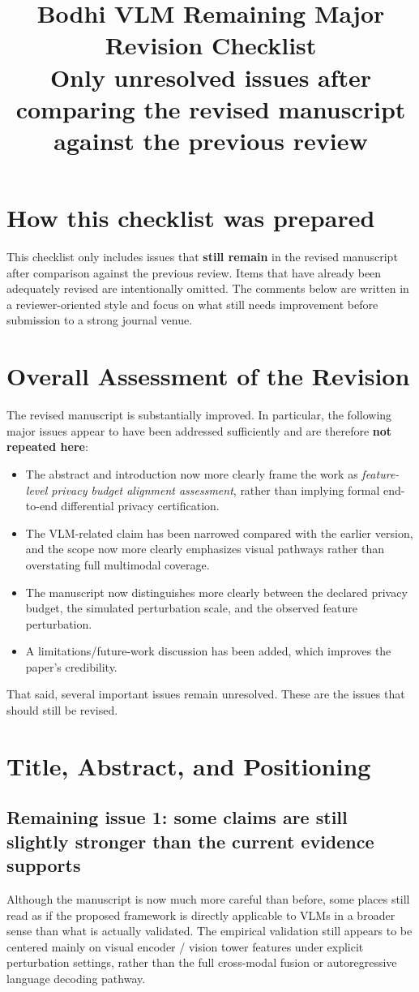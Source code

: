 \documentclass[11pt]{article}
\title{Bodhi VLM Remaining Major Revision Checklist\\
\large Only unresolved issues after comparing the revised manuscript against the previous review}
\author{}
\date{}
\begin{document}
\maketitle

\section*{How this checklist was prepared}
This checklist only includes issues that \textbf{still remain} in the revised manuscript after comparison against the previous review. 
Items that have already been adequately revised are intentionally omitted. 
The comments below are written in a reviewer-oriented style and focus on what still needs improvement before submission to a strong journal venue.

\section*{Overall Assessment of the Revision}
The revised manuscript is substantially improved. In particular, the following major issues appear to have been addressed sufficiently and are therefore \textbf{not repeated here}:
\begin{itemize}
    \item The abstract and introduction now more clearly frame the work as \emph{feature-level privacy budget alignment assessment}, rather than implying formal end-to-end differential privacy certification.
    \item The VLM-related claim has been narrowed compared with the earlier version, and the scope now more clearly emphasizes visual pathways rather than overstating full multimodal coverage.
    \item The manuscript now distinguishes more clearly between the declared privacy budget, the simulated perturbation scale, and the observed feature perturbation.
    \item A limitations/future-work discussion has been added, which improves the paper's credibility.
\end{itemize}

That said, several important issues remain unresolved. These are the issues that should still be revised.

\section{Title, Abstract, and Positioning}

\subsection*{Remaining issue 1: some claims are still slightly stronger than the current evidence supports}
Although the manuscript is now much more careful than before, some places still read as if the proposed framework is directly applicable to VLMs in a broader sense than what is actually validated. The empirical validation still appears to be centered mainly on visual encoder / vision tower features under explicit perturbation settings, rather than the full cross-modal fusion or autoregressive language decoding pathway.
\end{document}
